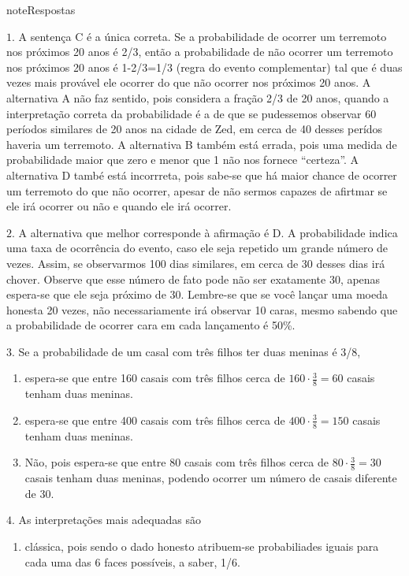 \begin{sphinxadmonition}{note}{Respostas}

\(1.\) A sentença C é a única correta. Se a probabilidade de ocorrer um terremoto nos próximos 20 anos é 2/3, então a probabilidade de não ocorrer um terremoto nos próximos 20 anos é 1-2/3=1/3 (regra do evento complementar) tal que é duas vezes mais provável ele ocorrer do que não ocorrer nos próximos 20 anos. A alternativa A não faz sentido, pois considera a fração 2/3 de 20 anos, quando a interpretação correta da probabilidade é a de que se pudessemos observar 60 períodos similares de 20 anos na cidade de Zed, em cerca de 40 desses perídos haveria um terremoto. A alternativa B também está errada, pois uma medida de probabilidade maior que zero e menor que 1 não nos fornece “certeza”. A alternativa D també está incorrreta, pois sabe-se que há maior chance de ocorrer um terremoto do que não ocorrer, apesar de não sermos capazes de afirtmar se ele irá ocorrer ou não e quando ele irá ocorrer.

\(2.\) A alternativa que melhor corresponde à afirmação é D. A probabilidade indica uma taxa de ocorrência do evento, caso ele seja repetido um grande número de vezes. Assim, se observarmos 100 dias similares, em cerca de 30 desses dias irá chover. Observe que esse número de fato pode não ser exatamente 30, apenas espera-se que ele seja próximo de 30. Lembre-se que se você lançar uma moeda honesta 20 vezes, não necessariamente irá observar 10 caras, mesmo sabendo que a probabilidade de ocorrer cara em cada lançamento é 50\%.

\(3.\) Se a probabilidade de um casal com três filhos ter duas meninas é 3/8,
\begin{enumerate}
\item {} 
espera-se que entre 160 casais com três filhos cerca de \(160\cdot \frac{3}{8}=60\) casais tenham duas meninas.

\item {} 
espera-se que entre 400 casais com três filhos cerca de \(400\cdot \frac{3}{8}=150\) casais tenham duas meninas.

\item {} 
Não, pois espera-se que entre 80 casais com três filhos cerca de \(80\cdot \frac{3}{8}=30\) casais tenham duas meninas, podendo ocorrer um número de casais diferente de 30.

\end{enumerate}

\(4.\) As interpretações mais adequadas são
\begin{enumerate}
\item {} 
clássica, pois sendo o dado honesto atribuem-se probabiliades iguais para cada uma das 6 faces possíveis, a saber, 1/6.


\end{enumerate}
\end{sphinxadmonition}
